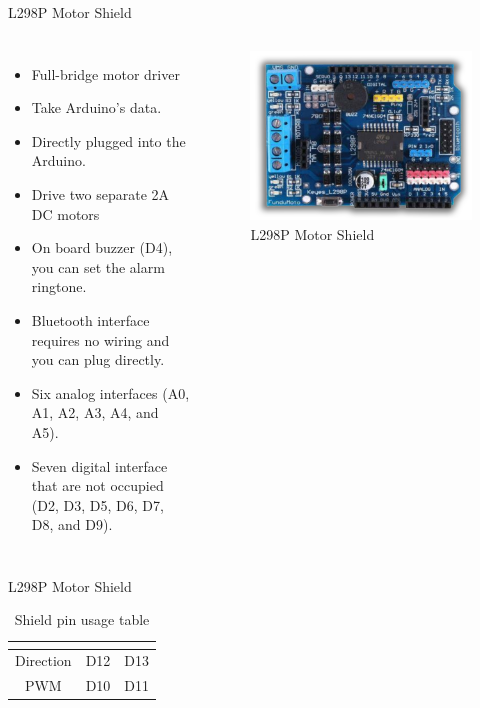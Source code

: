 \documentclass[xcolor=table, 9pt]{beamer}
\begin{document}


\begin{frame}{L298P Motor Shield}
\begin{columns}[c] 
\begin{itemize}
\item Full-bridge motor driver 
\item Take Arduino's data.
\item Directly plugged into the Arduino.
\item Drive two separate 2A DC motors 
\item On board buzzer (D4), you can set the alarm ringtone.
\item Bluetooth interface requires no wiring and you can plug directly.
\item Six analog interfaces (A0, A1, A2, A3, A4, and A5).
\item Seven digital interface that are not occupied (D2, D3, D5, D6, D7, D8, and D9).
\end{itemize}
\begin{figure}
\includegraphics[width=1\linewidth]{l298.png}
\caption{L298P Motor Shield}
\end{figure}
\end{columns}
\end{frame}



\begin{frame}{L298P Motor Shield}
\begin{table}[h]
\centering 
\begin{tabular}{|c|c|c|}
 \hline
 \textbf{\emph{\cellcolor{red!27}{\small Function}}} & \textbf{\emph{\cellcolor{red!27}{\small Channel A Pin}}} & \textbf{\emph{\cellcolor{red!27}{\small Channel B Pin}}}	\\ [0.5ex] \hline
 {\small Direction} & {\small D12} & {\small D13} \\  \hline
 {\small PWM} & {\small D10} & {\small D11}\\ 
 \hline
\end{tabular}
\caption{Shield pin usage table}
\label{table:1}
\end{table}
\end{frame}
\end{document}
